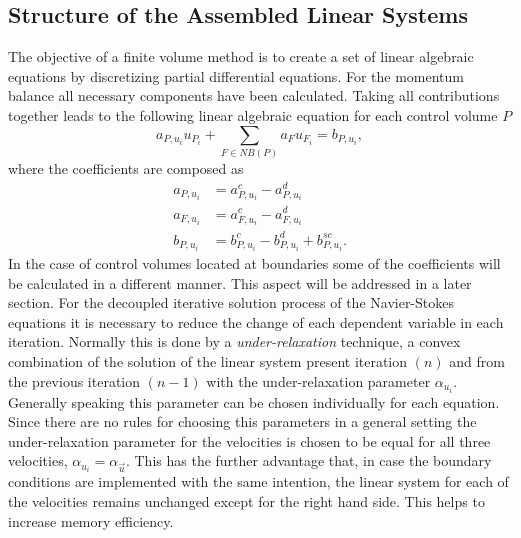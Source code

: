   \subsection{Structure of the Assembled Linear Systems}

    The objective of a finite volume method is to create a set of linear algebraic equations by discretizing partial differential equations. For the momentum balance all necessary components have been calculated. Taking all contributions together leads to the following linear algebraic equation for each control volume \(P\)
    \begin{displaymath}
      a_{P,u_i} u_{P_i} + \sum_{F \in NB(P)} a_F u_{F_i} = b_{P,u_i},
    \end{displaymath}
    where the coefficients are composed as
    \begin{align}
      a_{P,u_i} &= a_{P,u_i}^c - a_{P,u_i}^d \\
      a_{F,u_i} &= a_{F,u_i}^c - a_{F,u_i}^d \\
      b_{P,u_i} &= b_{P,u_i}^c - b_{P,u_i}^d + b_{P,u_i}^{sc}.
    \end{align}
    In the case of control volumes located at boundaries some of the coefficients will be calculated in a different manner. This aspect will be addressed in a later section. For the decoupled iterative solution process of the Navier-Stokes equations it is necessary to reduce the change of each dependent variable in each iteration. Normally this is done by a \emph{under-relaxation} technique, a convex combination of the solution of the linear system present iteration \((n)\) and from the previous iteration \((n-1)\) with the under-relaxation parameter \(\alpha_{u_i}\). Generally speaking this parameter can be chosen individually for each equation. Since there are no rules for choosing this parameters in a general setting the under-relaxation parameter for the velocities is chosen to be equal for all three velocities, \(\alpha_{u_i} = \alpha_{\vec{u}}\). This has the further advantage that, in case the boundary conditions are implemented with the same intention, the linear system for each of the velocities remains unchanged except for the right hand side. This helps to increase memory efficiency.


